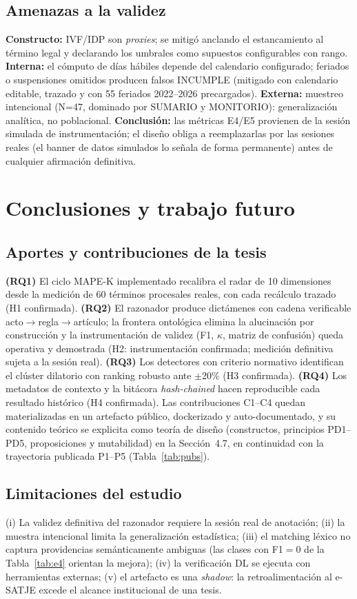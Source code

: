 \documentclass[a4paper,openany,12pt]{book}
\begin{document}
\section{Amenazas a la validez}
\textbf{Constructo:} IVF/IDP son \textit{proxies}; se mitigó anclando el estancamiento al término legal y declarando los umbrales como supuestos configurables con rango. \textbf{Interna:} el cómputo de días hábiles depende del calendario configurado; feriados o suspensiones omitidos producen falsos INCUMPLE (mitigado con calendario editable, trazado y con 55 feriados 2022--2026 precargados). \textbf{Externa:} muestreo intencional (N=47, dominado por SUMARIO y MONITORIO): generalización analítica, no poblacional. \textbf{Conclusión:} las métricas E4/E5 provienen de la sesión simulada de instrumentación; el diseño obliga a reemplazarlas por las sesiones reales (el banner de datos simulados lo señala de forma permanente) antes de cualquier afirmación definitiva.

\chapter{Conclusiones y trabajo futuro}
\section{Aportes y contribuciones de la tesis}
\textbf{(RQ1)} El ciclo MAPE-K implementado recalibra el radar de 10 dimensiones desde la medición de 60 términos procesales reales, con cada recálculo trazado (H1 confirmada). \textbf{(RQ2)} El razonador produce dictámenes con cadena verificable acto$\to$regla$\to$artículo; la frontera ontológica elimina la alucinación por construcción y la instrumentación de validez (F1, $\kappa$, matriz de confusión) queda operativa y demostrada (H2: instrumentación confirmada; medición definitiva sujeta a la sesión real). \textbf{(RQ3)} Los detectores con criterio normativo identifican el clúster dilatorio con ranking robusto ante $\pm$20\% (H3 confirmada). \textbf{(RQ4)} Los metadatos de contexto y la bitácora \textit{hash-chained} hacen reproducible cada resultado histórico (H4 confirmada). Las contribuciones C1--C4 quedan materializadas en un artefacto público, dockerizado y auto-documentado, y su contenido teórico se explicita como teoría de diseño (constructos, principios PD1--PD5, proposiciones y mutabilidad) en la Sección~4.7, en continuidad con la trayectoria publicada P1--P5 (Tabla~\ref{tab:pubs}).
\section{Limitaciones del estudio}
(i) La validez definitiva del razonador requiere la sesión real de anotación; (ii) la muestra intencional limita la generalización estadística; (iii) el matching léxico no captura providencias semánticamente ambiguas (las clases con F1$=$0 de la Tabla~\ref{tab:e4} orientan la mejora); (iv) la verificación DL se ejecuta con herramientas externas; (v) el artefacto es una \textit{shadow}: la retroalimentación al e-SATJE excede el alcance institucional de una tesis.
\end{document}
